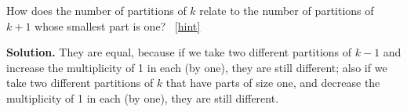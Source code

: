 \documentclass{book}
\begin{document}
\setcounter{project}{213}
\addtocounter{project}{-1}
\begin{activity}[]\label{activity-206}
\hypertarget{p-1201}{}%
How does the number of partitions of \(k\) relate to the number of partitions of \(k+1\) whose smallest part is one?%
~\hfill{\tiny\hyperlink{a-213}{[hint]}\hypertarget{q-213}{}}\par\smallskip%
\noindent\textbf{Solution.}\hypertarget{solution-139}{}\quad%
\hypertarget{p-1203}{}%
They are equal, because if we take two different partitions of \(k-1\) and increase the multiplicity of 1 in each (by one), they are still different; also if we take two different partitions of \(k\) that have parts of size one, and decrease the multiplicity of 1 in each (by one), they are still different.%
\end{activity}
\end{document}
